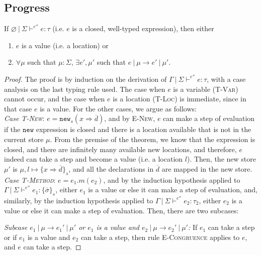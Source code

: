 \documentclass{llncs}
\newcommand{\keywadj}[1]{\mathtt{#1}}
\begin{document}
\subsection{Progress}

\begin{theorem}[Progress]
If $\varnothing~|~\Sigma \vdash^{e''} e : \tau$ (i.e. $e$ is a closed, well-typed expression), then either
\begin{enumerate}
\item $e$ is a value (i.e. a location) or
\item $\forall \mu$ such that $\mu : \Sigma$,
   $\exists e', \mu'$ such that $e~|~\mu \longrightarrow e'~|~\mu'$.
\end{enumerate}
\end{theorem}
\begin{proof} The proof is by induction on the derivation of $\Gamma~|~\Sigma \vdash^{e''} e : \tau$, with a case analysis on the last typing rule used. The case when $e$ is a variable (\textsc{T-Var}) cannot occur, and the case when $e$ is a location (\textsc{T-Loc}) is immediate, since in that case $e$ is a value. For the other cases, we argue as follows:
\\

\noindent\textit{Case \textsc{T-New}}:
$e = \keywadj{new}_{s}(x \Rightarrow \overline{d})$, and by \textsc{E-New}, $e$ can make a step of evaluation if the $\keywadj{new}$ expression is closed and there is a location available that is not in the current store $\mu$. From the premise of the theorem, we know that the expression is closed, and there are infinitely many available new locations, and therefore, $e$ indeed can take a step and become a value (i.e. a location $l$). Then, the new store $\mu'$ is $\mu, l \mapsto \{ x \Rightarrow \overline{d} \}_{s}$, and all the declarations in $\overline{d}$ are mapped in the new store.
\\

\noindent\textit{Case \textsc{T-Method}}:
$e = e_1.m(e_2)$, and by the induction hypothesis applied to $\Gamma~|~\Sigma \vdash^{e''} e_1 : \{ \overline{\sigma} \}_s$, either $e_1$ is a value or else it can make a step of evaluation, and, similarly, by the induction hypothesis applied to $\Gamma~|~\Sigma \vdash^{e''} e_2 : \tau_2$, either $e_2$ is a value or else it can make a step of evaluation. Then, there are two subcases:

\textit{Subcase $e_1~|~\mu \longrightarrow e_1'~|~\mu'$ or $e_1$ is a value and $e_2~|~\mu \longrightarrow e_2'~|~\mu'$:} If $e_1$ can take a step or if $e_1$ is a value and $e_2$ can take a step, then rule \textsc{E-Congruence} applies to $e$, and $e$ can take a step.


\end{proof}
\end{document}
